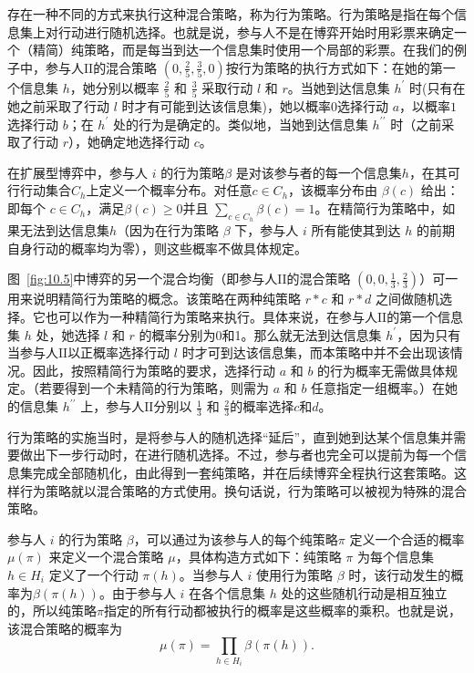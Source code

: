 存在一种不同的方式来执行这种混合策略，称为行为策略。行为策略是指在每个信息集上对行动进行随机选择。也就是说，参与人不是在博弈开始时用彩票来确定一个（精简）纯策略，而是每当到达一个信息集时使用一个局部的彩票。在我们的例子中，参与人$\mathrm{II}$的混合策略 \(\left( {0,\frac{2}{5},\frac{3}{5},0}\right)\)按行为策略的执行方式如下：在她的第一个信息集 \(h\)，她分别以概率 \(\frac{2}{5}\) 和 \(\frac{3}{5}\) 采取行动 \(l\) 和 \(r\)。当她到达信息集 \({h}^{\prime }\) 时(只有在她之前采取了行动 \(l\) 时才有可能到达该信息集)，她以概率$0$选择行动 \(a\)，以概率$1$选择行动 \(b\)；在 \({h}^{\prime }\) 处的行为是确定的。类似地，当她到达信息集 \({h}^{\prime \prime }\) 时（之前采取了行动 \(r\)），她确定地选择行动 \(c\)。

\begin{definition}
\label{def:10.3}
在扩展型博弈中，参与人 \(i\) 的行为策略\(\beta\)
是对该参与者的每一个信息集$h$，在其可行行动集合\(C_h\)上定义一个概率分布。对任意\(c \in  {C}_{h}\)，该概率分布由 \(\beta \left( c\right)\) 给出：即每个 \(c \in  {C}_{h}\)，满足\(\beta \left( c\right)  \geq  0\)并且 \(\mathop{\sum }\limits_{{c \in  {C}_{h}}}\beta \left( c\right)  = 1\)。在精简行为策略中，如果无法到达信息集\(h\)（因为在行为策略 \(\beta\) 下，参与人 \(i\) 所有能使其到达 \(h\) 的前期自身行动的概率均为零），则这些概率不做具体规定。
\end{definition}

图~\ref{fig:10.5}中博弈的另一个混合均衡（即参与人$\mathrm{II}$的混合策略 \(\left( {0,0,\frac{1}{3},\frac{2}{3}}\right)\)）可一用来说明精简行为策略的概念。该策略在两种纯策略 \(r * c\) 和 \(r * d\) 之间做随机选择。它也可以作为一种精简行为策略来执行。具体来说，在参与人$\mathrm{II}$的第一个信息集 \(h\) 处，她选择 \(l\) 和 \(r\) 的概率分别为0和1。那么就无法到达信息集 \({h}^{\prime }\)，因为只有当参与人$\mathrm{II}$以正概率选择行动 \(l\) 时才可到达该信息集，而本策略中并不会出现该情况。因此，按照精简行为策略的要求，选择行动 \(a\) 和 \(b\) 的行为概率无需做具体规定。（若要得到一个未精简的行为策略，则需为 \(a\) 和 \(b\) 任意指定一组概率。）在她的信息集 \({h}^{\prime \prime }\) 上，参与人$\mathrm{II}$分别以 \(\frac{1}{3}\) 和 \(\frac{2}{3}\)的概率选择\(c\)和\(d\)。

行为策略的实施当时，是将参与人的随机选择“延后”，直到她到达某个信息集并需要做出下一步行动时，在进行随机选择。不过，参与者也完全可以提前为每一个信息集完成全部随机化，由此得到一套纯策略，并在后续博弈全程执行这套策略。这样行为策略就以混合策略的方式使用。换句话说，行为策略可以被视为特殊的混合策略。

参与人 \(i\) 的行为策略 \(\beta\)，可以通过为该参与人的每个纯策略\(\pi\) 定义一个合适的概率 \(\mu \left( \pi \right)\) 来定义一个混合策略 \(\mu\)，具体构造方式如下：纯策略 \(\pi\) 为每个信息集 \(h \in  {H}_{i}\) 定义了一个行动 \(\pi \left( h\right)\)。当参与人 \(i\) 使用行为策略 \(\beta\) 时，该行动发生的概率为\(\beta \left( {\pi \left( h\right) }\right)\)。由于参与人 \(i\) 在各个信息集 \(h\) 处的这些随机行动是相互独立的，所以纯策略\(\pi\)指定的所有行动都被执行的概率是这些概率的乘积。也就是说，该混合策略的概率为
\begin{equation}
\label{eq:10.3}
\mu \left( \pi \right)  = \mathop{\prod }\limits_{{h \in  {H}_{i}}}\beta \left( {\pi \left( h\right) }\right) .
\end{equation}

